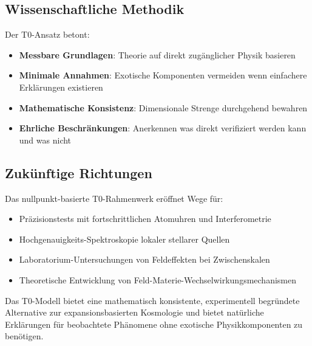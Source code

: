 \documentclass[12pt,a4paper]{article}
\begin{document}
	\subsection{Wissenschaftliche Methodik}
	\label{subsec:scientific_methodology}
	
	Der T0-Ansatz betont:
	\begin{itemize}
		\item \textbf{Messbare Grundlagen}: Theorie auf direkt zug\"anglicher Physik basieren
		\item \textbf{Minimale Annahmen}: Exotische Komponenten vermeiden wenn einfachere Erkl\"arungen existieren
		\item \textbf{Mathematische Konsistenz}: Dimensionale Strenge durchgehend bewahren
		\item \textbf{Ehrliche Beschr\"ankungen}: Anerkennen was direkt verifiziert werden kann und was nicht
	\end{itemize}
	
	\subsection{Zuk\"unftige Richtungen}
	\label{subsec:future_directions}
	
	Das nullpunkt-basierte T0-Rahmenwerk er\"offnet Wege f\"ur:
	\begin{itemize}
		\item Pr\"azisionstests mit fortschrittlichen Atomuhren und Interferometrie
		\item Hochgenauigkeits-Spektroskopie lokaler stellarer Quellen
		\item Laboratorium-Untersuchungen von Feldeffekten bei Zwischenskalen
		\item Theoretische Entwicklung von Feld-Materie-Wechselwirkungsmechanismen
	\end{itemize}
	
	Das T0-Modell bietet eine mathematisch konsistente, experimentell begr\"undete Alternative zur expansionsbasierten Kosmologie und bietet nat\"urliche Erkl\"arungen f\"ur beobachtete Ph\"anomene ohne exotische Physikkomponenten zu ben\"otigen.
	
\end{document}
